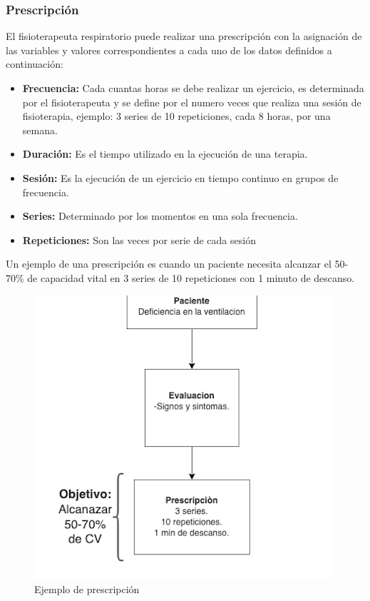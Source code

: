 \documentclass[12pt]{article}
\begin{document}
\subsubsection{Prescripción}

El fisioterapeuta respiratorio puede realizar una prescripción con la asignación de las variables y valores correspondientes a cada uno de los datos definidos a continuación: 

\begin{itemize}
    \item \textbf{Frecuencia:} Cada cuantas horas se debe realizar un ejercicio, es determinada por el fisioterapeuta y se define por el numero veces que realiza una sesión de fisioterapia, ejemplo: 3 series de 10 repeticiones, cada 8 horas, por una semana.
    \item \textbf{Duración:} Es el tiempo utilizado en la ejecución de una terapia.
    \item \textbf{Sesión:} Es la ejecución de un ejercicio en tiempo continuo en grupos de frecuencia.
    \item \textbf{Series:} Determinado por los momentos en una sola frecuencia.
    \item \textbf{Repeticiones:} Son las veces por serie de cada sesión
\end{itemize}
    
Un ejemplo de una prescripción es cuando un paciente necesita alcanzar el 50-70\% de capacidad vital en 3 series de 10 repeticiones con 1 minuto de descanso.


\begin{figure}[ht]
\centering
\includegraphics[scale=0.45]{imag/prescripcion.png}
\caption{Ejemplo de prescripción}
\label{4}
\end{figure}
\FloatBarrier
\end{document}
